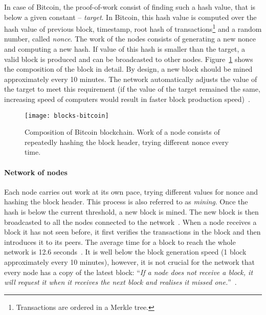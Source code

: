 In case of Bitcoin, the proof-of-work consist of finding such a hash value, that is below a given constant -- \textit{target}. In Bitcoin, this hash value is computed over the hash value of previous block, timestamp\footnotemark, root hash of transactions\footnote{Transactions are ordered in a Merkle tree.} and a random number, called \textit{nonce}. The work of the nodes consists of generating a new nonce and computing a new hash. If value of this hash is smaller than the target, a valid block is produced and can be broadcasted to other nodes. Figure~\ref{fig:blocks-bitcoin} shows the composition of the block in detail. By design, a new block should be mined approximately every 10 minutes. The network automatically adjusts the value of the target to meet this requirement (if the value of the target remained the same, increasing speed of computers would result in faster block production speed)~\cite{Decker2013InformationNetwork}.
% 
% 
\begin{figure}[ht]
    \centering
    \texttt{[image: blocks-bitcoin]}
    \caption{Composition of Bitcoin blockchain. Work of a node consists of repeatedly hashing the block header, trying different nonce every time.}
    \label{fig:blocks-bitcoin}
\end{figure}
% 
\paragraph{Network of nodes}
Each node carries out work at its own pace, trying different values for nonce and hashing the block header. This process is also referred to as \textit{mining}. Once the hash is below the current threshold, a new block is mined. The new block is then broadcasted to all the nodes connected to the network~\cite{NakamotoBitcoin:System}. When a node receives a block it has not seen before, it first verifies the transactions in the block and then introduces it to its peers. The average time for a block to reach the whole network is 12.6 seconds~\cite{Decker2013InformationNetwork}. It is well below the block generation speed (1 block approximately every 10 minutes), however, it is not crucial for the network that every node has a copy of the latest block: ``\textit{If a node does not receive a block, it will request it when it receives the next block and realises it missed one.}''~\cite{NakamotoBitcoin:System}.
% 
